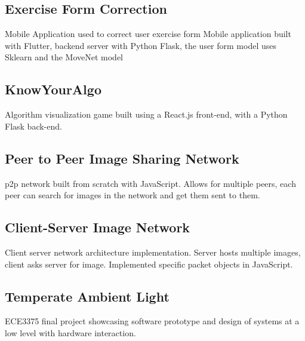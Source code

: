 \documentclass[a4paper, 12pt]{article}
\begin{document}
\subsection {{Exercise Form Correction}\hfill }
 Mobile Application used to correct user exercise form
Mobile application built with Flutter, backend server with Python Flask, the user form model uses Sklearn and the MoveNet model
\subsection {{}\hfill }

\subsection {{KnowYourAlgo}\hfill }
Algorithm visualization game built using a React.js front-end, with a Python Flask back-end.
\subsection {{}\hfill }
\subsection {{Peer to Peer Image Sharing Network}\hfill }
p2p network built from scratch with JavaScript. Allows for multiple peers, each peer can search for images in the network and get them sent to them. 

\subsection {{}\hfill }
\subsection {{Client-Server Image Network}\hfill }

Client server network architecture implementation. Server hosts multiple images, client asks server for image. Implemented specific packet objects in JavaScript.
\subsection {{}\hfill }

\subsection {{Temperate Ambient Light}\hfill }
ECE3375 final project showcasing software prototype and design of systems at a low level with hardware interaction.
\end{document}
